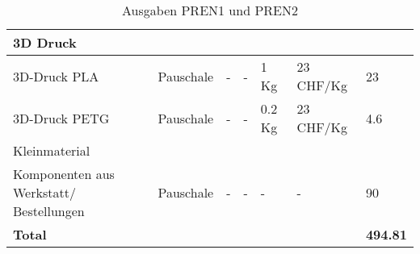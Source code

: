 \documentclass[main.tex]{subfiles} %
\begin{document}
\begin{table}[htbp]
{\begin{tabular}{|p{3cm}|p{2.5cm}|p{2.5cm}|p{3cm}|p{1cm}|p{1.5cm}|p{1cm}|}
            \rowcolor{lightgray} 3D Druck           &                    &                              &                         &                 &                           &                            \\ \hline
            3D-Druck PLA                            & Pauschale          & -                            & -                       & 1 Kg            & 23 CHF/Kg                 & 23                          \\ \hline
            3D-Druck PETG                           & Pauschale          & -                            & -                       & 0.2 Kg          & 23 CHF/Kg                 & 4.6                         \\ \hline
            \rowcolor{lightgray} Kleinmaterial      &                    &                              &                         &                 &                           &                             \\ \hline
            Komponenten aus Werkstatt/ Bestellungen & Pauschale          & -                            & -                       & -               & -                         & 90                          \\ \hline
            \textbf{Total}                          &                    &                              &                         &                 &                           & \textbf{494.81}              \\ \hline
        \end{tabular}
    }
    \caption{Ausgaben PREN1 und PREN2}
    \label{tab:Ausgaben_PREN}
\end{table}
\end{document}
